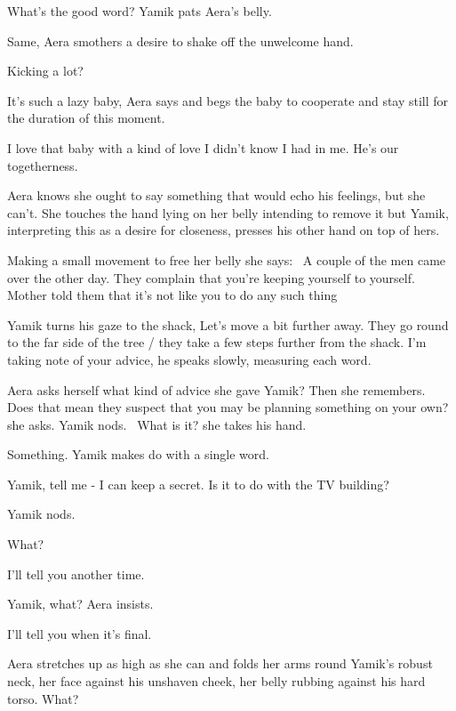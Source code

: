 \documentclass[letterpaper]{article}
\begin{document}
{\textquotedbl}What's the good word?{\textquotedbl} Yamik pats Aera's belly. 

{\textquotedbl}Same,{\textquotedbl} Aera smothers a desire to shake off the unwelcome hand. 

{\textquotedbl}Kicking a lot?{\textquotedbl} 

{\textquotedbl}It's such a lazy baby,{\textquotedbl} Aera says and begs the baby to cooperate and stay still for the
duration of this moment. 

{\textquotedbl}I love that baby with a kind of love I didn't know I had in me. He's our togetherness.{\textquotedbl}

Aera knows she ought to say something that would echo his feelings, but she can't. She touches the hand lying on her
belly intending to remove it but Yamik, interpreting this as a desire for closeness, presses his other hand on top of
hers. ~

Making a small movement to free her belly she says: \ {\textquotedbl}A couple of the men came over the other day. They
complain that you're keeping yourself to yourself. Mother told them that it's not like you to do any such
thing{\textquotedbl} 

Yamik turns his gaze to the shack, {\textquotedbl}Let's move a bit further away.{\textquotedbl} They go round to the far
side of the tree / they take a few steps further from the shack. {\textquotedbl}I'm taking note of your
advice,{\textquotedbl} he speaks slowly, measuring each word. 

Aera asks herself what kind of advice she gave Yamik? Then she remembers. {\textquotedbl}Does that mean they suspect
that you may be planning something on your own?{\textquotedbl} she asks. Yamik nods. \ {\textquotedbl}What is
it?{\textquotedbl} she takes his hand. 

{\textquotedbl}Something.{\textquotedbl} Yamik makes do with a single word. 

{\textquotedbl}Yamik, tell me - I can keep a secret. Is it to do with the TV building?{\textquotedbl} 

Yamik nods. 

{\textquotedbl}What?{\textquotedbl} 

{\textquotedbl}I'll tell you another time.{\textquotedbl} 

{\textquotedbl}Yamik, what?{\textquotedbl} Aera insists.

{\textquotedbl}I'll tell you when it's final.{\textquotedbl} 

Aera stretches up as high as she can and folds her arms round Yamik's robust neck, her face against his unshaven cheek,
her belly rubbing against his hard torso. {\textquotedbl}What?{\textquotedbl} 
\end{document}
